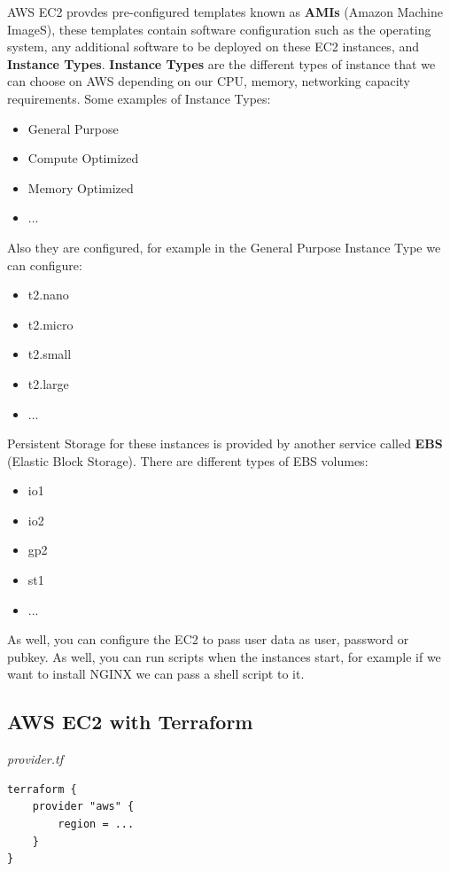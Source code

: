 \documentclass{article}
\newenvironment{codetemplate}[1][]{%
  \mybasecolorbox[#1]
  \itshape
}{%
  \endmybasecolorbox
}
\begin{document}
AWS EC2 provdes pre-configured templates known as \textbf{AMIs} (Amazon Machine ImageS), these templates contain software configuration such as the operating system, any additional software to be deployed on these EC2 instances, and \textbf{Instance Types}. \textbf{Instance Types} are the different types of instance that we can choose on AWS depending on our CPU, memory, networking capacity requirements. Some examples of Instance Types:

\begin{itemize}
    \item General Purpose
    \item Compute Optimized
    \item Memory Optimized
    \item ...
\end{itemize}

Also they are configured, for example in the General Purpose Instance Type we can configure:
\begin{itemize}
    \item t2.nano
    \item t2.micro
    \item t2.small
    \item t2.large
    \item ...
\end{itemize}

Persistent Storage for these instances is provided by another service called \textbf{EBS} (Elastic Block Storage). There are different types of EBS volumes:
\begin{itemize}
    \item io1
    \item io2
    \item gp2
    \item st1
    \item ...
\end{itemize}

As well, you can configure the EC2 to pass user data as user, password or pubkey. As well, you can run scripts when the instances start, for example if we want to install NGINX we can pass a shell script to it.

\subsection{AWS EC2 with Terraform}

\begin{codetemplate}{provider.tf}
\begin{verbatim}
terraform {
    provider "aws" {
        region = ...
    }
}
\end{verbatim}
\end{codetemplate}
\end{document}
